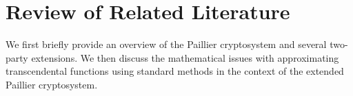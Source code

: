 \section{Review of Related Literature}

We first briefly provide an overview of the Paillier cryptosystem and several two-party extensions. We then discuss the mathematical issues with approximating transcendental functions using standard methods in the context of the extended Paillier cryptosystem.



